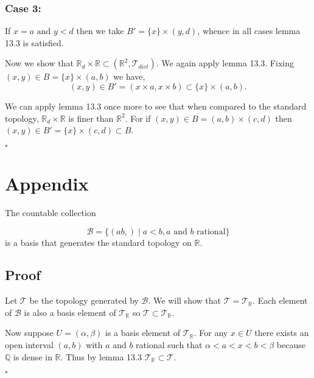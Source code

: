 \documentclass[11pt, oneside]{article}   	%
\newcommand{\R}{\mathbb{R}}
\newcommand{\bb}[1]{\mathbb{#1}}
\newcommand{\scr}[1]{\mathscr{#1}}
\newcommand{\tand}{\text{ and }}
\newcommand{\qed}{\begin{center}
$\square$
\end{center}}
\begin{document}
\subsubsection*{Case 3:}
If $x = a \tand y < d$ then we take $B' = \{x\} \times (y, d)$, whence in all cases lemma 13.3 is satisfied.

Now we show that $\R_d \times \R \subset (\R^2 , \scr{T}_{dict})$. We again apply lemma 13.3. Fixing $(x,y) \in B = \{x\} \times (a,b)$ we have,
\[
 (x,y) \in B' = (x\times a, x \times b) \subset \{x\} \times (a,b).
\]

We can apply lemma 13.3 once more to see that when compared to the standard topology, $\R_d \times \R$ is finer than $\R^2$. For if $(x,y) \in B = (a,b) \times (c,d)$ then $(x,y) \in B' = \{x\} \times (c,d) \subset B$.
\qed

\section*{Appendix}
The countable collection 

\begin{equation*}
\scr{B} = \{(ab,) \mid a< b, a \tand b \text{ rational} \}
\end{equation*}
is a basis that generates the standard topology on $\R$.


\subsection*{Proof}

Let $\scr{T}$ be the topology generated by $\scr{B}$. We will show that $\scr{T} = \scr{T}_\R$. Each element of $\scr{B}$ is also a basis element of $\scr{T}_\R$ so $ \scr{T} \subset \scr{T}_\R$.

 Now suppose $U = (\alpha,\beta)$ is a basis element of $\scr{T}_\R$. For any $ x \in U$ there exists an open interval $(a,b)$ with  $a \tand b$ rational such that $\alpha < a < x < b < \beta$ because $\bb{Q}$ is dense in $\R$. Thus by lemma 13.3 $\scr{T}_\R \subset \scr{T}$. \qed
\end{document}
